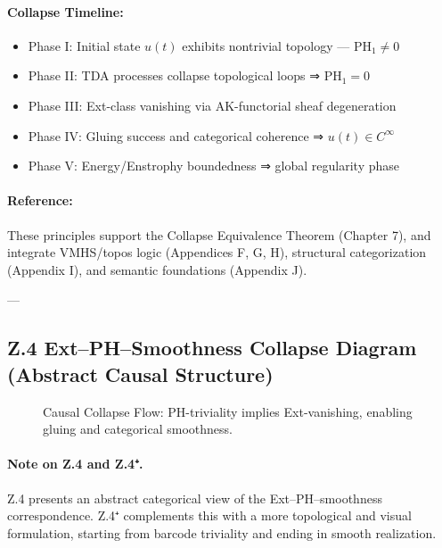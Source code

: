 \documentclass[11pt]{article}
\begin{document}
\begin{axiom}
\begin{axiom}
{{\paragraph{Collapse Timeline:}
\begin{itemize}
  \item Phase I: Initial state \( u(t) \) exhibits nontrivial topology — PH\(_1 \ne 0\)
  \item Phase II: TDA processes collapse topological loops ⇒ \( \mathrm{PH}_1 = 0 \)
  \item Phase III: Ext-class vanishing via AK-functorial sheaf degeneration
  \item Phase IV: Gluing success and categorical coherence ⇒ \( u(t) \in C^\infty \)
  \item Phase V: Energy/Enstrophy boundedness ⇒ global regularity phase
\end{itemize}

\paragraph{Reference:}
These principles support the Collapse Equivalence Theorem (Chapter 7),  
and integrate VMHS/topos logic (Appendices F, G, H), structural categorization (Appendix I),  
and semantic foundations (Appendix J).


---

\subsection*{Z.4 Ext–PH–Smoothness Collapse Diagram (Abstract Causal Structure)}

\begin{figure}[H]
\centering
{}
\caption{Causal Collapse Flow: PH-triviality implies Ext-vanishing, enabling gluing and categorical smoothness.}
\end{figure}

\paragraph{Note on Z.4 and Z.4⁺.}  
Z.4 presents an abstract categorical view of the Ext–PH–smoothness correspondence.  
Z.4⁺ complements this with a more topological and visual formulation, starting from barcode triviality and ending in smooth realization.

}}
\end{axiom}
\end{axiom}
\end{document}
